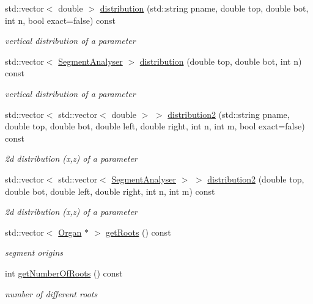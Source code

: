 \begin{DoxyCompactItemize}
std\+::vector$<$ double $>$ \hyperlink{classCPlantBox_1_1SegmentAnalyser_a847f313257ffd7a8442d2aecd12e34d2}{distribution} (std\+::string pname, double top, double bot, int n, bool exact=false) const
\begin{DoxyCompactList}\small\item\em vertical distribution of a parameter \end{DoxyCompactList}\item 
std\+::vector$<$ \hyperlink{classCPlantBox_1_1SegmentAnalyser}{Segment\+Analyser} $>$ \hyperlink{classCPlantBox_1_1SegmentAnalyser_a4353b3748dc58d4f8eda3d1e7a61aa41}{distribution} (double top, double bot, int n) const
\begin{DoxyCompactList}\small\item\em vertical distribution of a parameter \end{DoxyCompactList}\item 
std\+::vector$<$ std\+::vector$<$ double $>$ $>$ \hyperlink{classCPlantBox_1_1SegmentAnalyser_a45dc325035b8e48fc86a8aed7d4bab16}{distribution2} (std\+::string pname, double top, double bot, double left, double right, int n, int m, bool exact=false) const
\begin{DoxyCompactList}\small\item\em 2d distribution (x,z) of a parameter \end{DoxyCompactList}\item 
std\+::vector$<$ std\+::vector$<$ \hyperlink{classCPlantBox_1_1SegmentAnalyser}{Segment\+Analyser} $>$ $>$ \hyperlink{classCPlantBox_1_1SegmentAnalyser_ac693f16057e5b053d5397d66d0bff50c}{distribution2} (double top, double bot, double left, double right, int n, int m) const
\begin{DoxyCompactList}\small\item\em 2d distribution (x,z) of a parameter \end{DoxyCompactList}\item 
std\+::vector$<$ \hyperlink{classCPlantBox_1_1Organ}{Organ} $\ast$ $>$ \hyperlink{classCPlantBox_1_1SegmentAnalyser_a5b0a0f95ee7b03e64554eec01fb51b7c}{get\+Roots} () const
\begin{DoxyCompactList}\small\item\em segment origins \end{DoxyCompactList}\item 
int \hyperlink{classCPlantBox_1_1SegmentAnalyser_a4edbc03e22d117f24b437735d2ef1bd1}{get\+Number\+Of\+Roots} () const
\begin{DoxyCompactList}\small\item\em number of different roots \end{DoxyCompactList}\item 

\end{DoxyCompactItemize}

